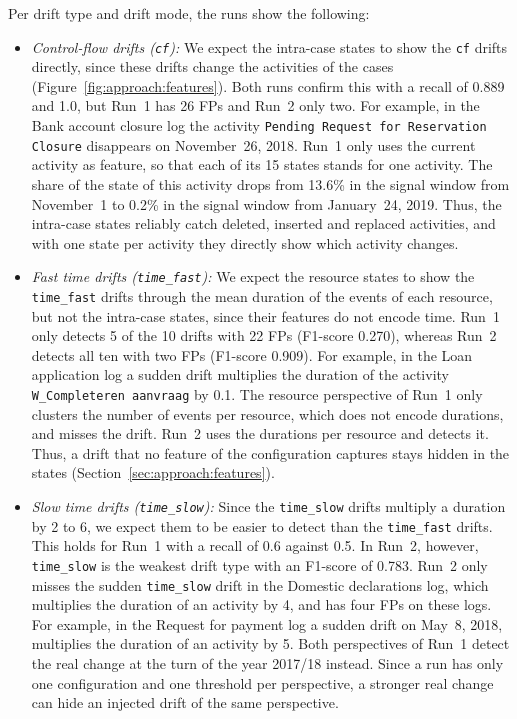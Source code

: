 Per drift type and drift mode, the runs show the following:
\begin{itemize}
	\item \emph{Control-flow drifts (\texttt{cf}):} \label{sec:eval:padella:cf} We expect the intra-case states to show the \texttt{cf} drifts directly, since these drifts change the activities of the cases (Figure~\ref{fig:approach:features}). Both runs confirm this with a recall of 0.889 and 1.0, but Run~1 has 26 FPs and Run~2 only two. For example, in the Bank account closure log the activity \texttt{Pending Request for Reservation Closure} disappears on November~26, 2018. Run~1 only uses the current activity as feature, so that each of its 15 states stands for one activity. The share of the state of this activity drops from 13.6\% in the signal window from November~1 to 0.2\% in the signal window from January~24, 2019. Thus, the intra-case states reliably catch deleted, inserted and replaced activities, and with one state per activity they directly show which activity changes.
	\item \emph{Fast time drifts (\texttt{time\_fast}):} \label{sec:eval:padella:time_fast} We expect the resource states to show the \texttt{time\_fast} drifts through the mean duration of the events of each resource, but not the intra-case states, since their features do not encode time. Run~1 only detects 5 of the 10 drifts with 22 FPs (F1-score 0.270), whereas Run~2 detects all ten with two FPs (F1-score 0.909). For example, in the Loan application log a sudden drift multiplies the duration of the activity \texttt{W\_Completeren aanvraag} by 0.1. The resource perspective of Run~1 only clusters the number of events per resource, which does not encode durations, and misses the drift. Run~2 uses the durations per resource and detects it. Thus, a drift that no feature of the configuration captures stays hidden in the states (Section~\ref{sec:approach:features}).
	\item \emph{Slow time drifts (\texttt{time\_slow}):} \label{sec:eval:padella:time_slow} Since the \texttt{time\_slow} drifts multiply a duration by 2 to 6, we expect them to be easier to detect than the \texttt{time\_fast} drifts. This holds for Run~1 with a recall of 0.6 against 0.5. In Run~2, however, \texttt{time\_slow} is the weakest drift type with an F1-score of 0.783. Run~2 only misses the sudden \texttt{time\_slow} drift in the Domestic declarations log, which multiplies the duration of an activity by 4, and has four FPs on these logs. For example, in the Request for payment log a sudden drift on May~8, 2018, multiplies the duration of an activity by 5. Both perspectives of Run~1 detect the real change at the turn of the year 2017/18 instead. Since a run has only one configuration and one threshold per perspective, a stronger real change can hide an injected drift of the same perspective.

\end{itemize}
